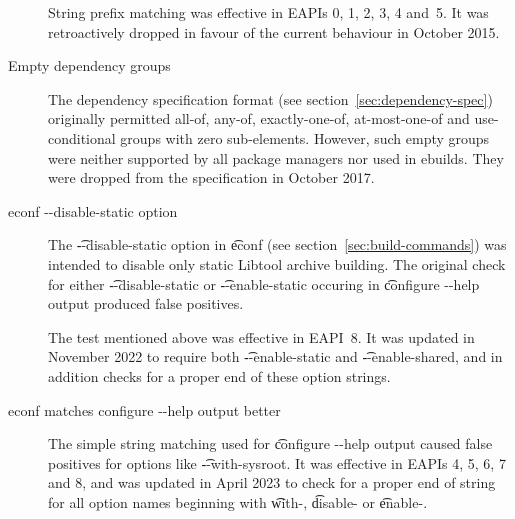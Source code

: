 \begin{description}
String prefix matching was effective in EAPIs 0, 1, 2, 3, 4 and~5. It was retroactively dropped
in favour of the current behaviour in October 2015.

\item[Empty dependency groups]
The dependency specification format (see section~\ref{sec:dependency-spec}) originally permitted
all-of, any-of, exactly-one-of, at-most-one-of and use-conditional groups with zero sub-elements.
However, such empty groups were neither supported by all package managers nor used in ebuilds.
They were dropped from the specification in October 2017.

\item[econf -{}-disable-static option]
The \t{-{}-disable-static} option in \t{econf} (see section~\ref{sec:build-commands}) was intended
to disable only static Libtool archive building. The original check for either
\t{-{}-disable-static} or \t{-{}-enable-static} occuring in \t{configure -{}-help} output produced
false positives.

The test mentioned above was effective in EAPI~8. It was updated in November 2022 to require both
\t{-{}-enable-static} and \t{-{}-enable-shared}, and in addition checks for a proper end of these
option strings.

\item[econf matches configure -{}-help output better]
The simple string matching used for \t{configure -{}-help} output caused false positives for options
like \t{-{}-with-sysroot}. It was effective in EAPIs 4, 5, 6, 7 and 8, and was updated in April 2023
to check for a proper end of string for all option names beginning with \t{with-}, \t{disable-} or
\t{enable-}.

\end{description}


